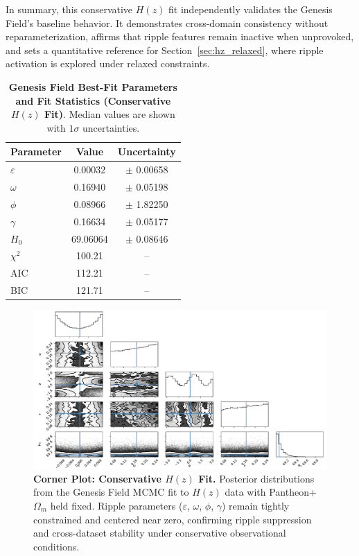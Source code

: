 In summary, this conservative $H(z)$ fit independently validates the Genesis Field’s baseline behavior. It demonstrates cross-domain consistency without reparameterization, affirms that ripple features remain inactive when unprovoked, and sets a quantitative reference for Section~\ref{sec:hz_relaxed}, where ripple activation is explored under relaxed constraints.

\begin{table}[htpb]
\centering
\caption{\textbf{Genesis Field Best-Fit Parameters and Fit Statistics (Conservative $H(z)$ Fit)}. Median values are shown with $1\sigma$ uncertainties.}
\vspace{0.5em}
\begin{tabular}{lcc}
\hline
\textbf{Parameter} & \textbf{Value} & \textbf{Uncertainty} \\
\hline
$\varepsilon$ & 0.00032   & $\pm$ 0.00658 \\
$\omega$      & 0.16940   & $\pm$ 0.05198 \\
$\phi$        & 0.08966   & $\pm$ 1.82250 \\
$\gamma$      & 0.16634   & $\pm$ 0.05177 \\
$H_0$         & 69.06064  & $\pm$ 0.08646 \\
\hline
$\chi^2$      & 100.21    & -- \\
AIC           & 112.21    & -- \\
BIC           & 121.71    & -- \\
\hline
\end{tabular}
\label{tab:hz_tight_params}
\end{table}

\begin{figure}[htpb]
\centering
\includegraphics[width=\textwidth]{figures/hz_corner_tight.pdf}
\caption{\textbf{Corner Plot: Conservative $H(z)$ Fit.} Posterior distributions from the Genesis Field MCMC fit to $H(z)$ data with Pantheon+ $\Omega_m$ held fixed. Ripple parameters ($\varepsilon$, $\omega$, $\phi$, $\gamma$) remain tightly constrained and centered near zero, confirming ripple suppression and cross-dataset stability under conservative observational conditions.}
\label{fig:corner_hz_tight}
\end{figure}

